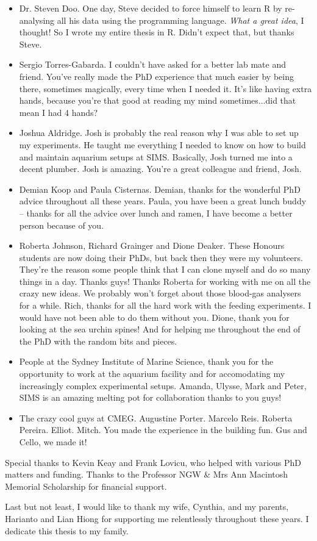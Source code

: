 \begin{itemize}
  \item Dr. Steven Doo. One day, Steve decided to force himself to learn R by re-analysing all his data using the programming language. \textit{What a great idea}, I thought! So I wrote my entire thesis in R. Didn't expect that, but thanks Steve.
  \item Sergio Torres-Gabarda. I couldn't have asked for a better lab mate and friend. You've really made the PhD experience that much easier by being there, sometimes magically, every time when I needed it. It's like having extra hands, because you're that good at reading my mind sometimes...did that mean I had 4 hands?
  \item Joshua Aldridge. Josh is probably the real reason why I was able to set up my experiments. He taught me everything I needed to know on how to build and maintain aquarium setups at SIMS. Basically, Josh turned me into a decent plumber. Josh is amazing. You're a great colleague and friend, Josh.
  \item Demian Koop and Paula Cisternas. Demian, thanks for the wonderful PhD advice throughout all these years. Paula, you have been a great lunch buddy -- thanks for all the advice over lunch and ramen, I have become a better person because of you.
  \item Roberta Johnson, Richard Grainger and Dione Deaker. These Honours students are now doing their PhDs, but back then they were my volunteers. They're the reason some people think that I can clone myself and do so many things in a day. Thanks guys! Thanks Roberta for working with me on all the crazy new ideas. We probably won't forget about those blood-gas analysers for a while. Rich, thanks for all the hard work with the feeding experiments. I would have not been able to do them without you. Dione, thank you for looking at the sea urchin spines! And for helping me throughout the end of the PhD with the random bits and pieces.
  \item People at the Sydney Institute of Marine Science, thank you for the opportunity to work at the aquarium facility and for accomodating my increasingly complex experimental setups. Amanda, Ulysse, Mark and Peter, SIMS is an amazing melting pot for collaboration thanks to you guys! 
  \item The crazy cool guys at CMEG. Augustine Porter. Marcelo Reis. Roberta Pereira. Elliot. Mitch. You made the experience in the building fun. Gus and Cello, we made it!
\end{itemize}

Special thanks to Kevin Keay and Frank Lovicu, who helped with various PhD matters and funding. Thanks to the Professor NGW \& Mrs Ann Macintosh Memorial Scholarship for financial support.

Last but not least, I would like to thank my wife, Cynthia, and my parents, Harianto and Lian Hiong for supporting me relentlessly throughout these years. I dedicate this thesis to my family.


\clearpage
